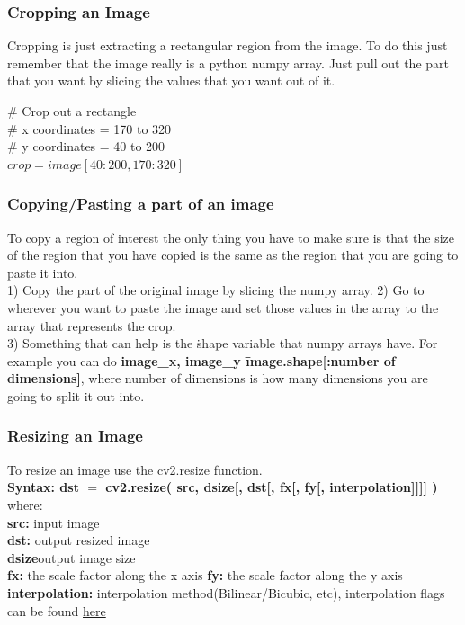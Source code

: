 \documentclass[fleqn]{article}
\begin{document}
      \subsubsection{Cropping an Image}
      Cropping is just extracting a rectangular region from the image. To do this just remember that the image really is a python numpy array. Just pull out the part that you want by slicing the values that you want out of it.

      \begin{center}
        \# Crop out a rectangle\\
        \# x coordinates = 170 to 320\\
        \# y coordinates = 40 to 200\\
        $crop = image[40:200,170:320]$\\
      \end{center}

      \subsubsection{Copying/Pasting a part of an image}
      To copy a region of interest the only thing you have to make sure is that the size of the region that you have copied is the same as the region that you are going to paste it into. \\
      1) Copy the part of the original image by slicing the numpy array.
      2) Go to wherever you want to paste the image and set those values in the array to the array that represents the crop. \\
      3) Something that can help is the \.shape variable that numpy arrays have. For example you can do \textbf{image\_x, image\_y \= image.shape[:number of dimensions]}, where number of dimensions is how many dimensions you are going to split it out into.

      \subsubsection{Resizing an Image}
      To resize an image use the cv2.resize function. \\
      \textbf{Syntax: dst $=$ cv2.resize(    src, dsize[, dst[, fx[, fy[, interpolation]]]]    )} where:\\
       \textbf{src: }input image\\
       \textbf{dst: }output resized image\\
       \textbf{dsize}output image size\\
       \textbf{fx: }the scale factor along the x axis
       \textbf{fy: }the scale factor along the y axis
       \textbf{interpolation: }interpolation method(Bilinear/Bicubic, etc), interpolation flags can be found \href{https://docs.opencv.org/4.1.0/da/d54/group__imgproc__transform.html#ga5bb5a1fea74ea38e1a5445ca803ff121}{here}
\end{document}
